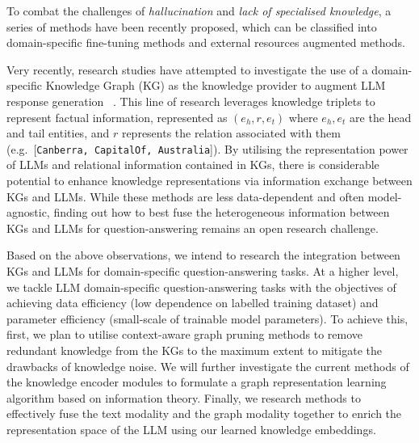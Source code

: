 To combat the challenges of \emph{hallucination} and \emph{lack of specialised knowledge}, a series of methods have been recently proposed, which can be classified into domain-specific fine-tuning methods and external resources augmented methods.



Very recently, research studies have attempted to investigate the use of a domain-specific Knowledge Graph (KG) as the knowledge
provider to augment LLM response generation ~\parencite{gnp, graph-prompter, kalm-prompting}.
This line of research leverages knowledge triplets to represent factual information, represented as $(e_h, r, e_t)$ where $e_h, e_t$ are the head and tail entities, and $r$ represents the relation associated with them (e.g.\ [\texttt{Canberra, CapitalOf, Australia}]).
By utilising the representation power of LLMs and relational information contained in KGs, there is considerable potential to enhance knowledge representations via information exchange between KGs and LLMs.
While these methods are less data-dependent and often model-agnostic, finding out how to best fuse the heterogeneous information between KGs and LLMs for question-answering remains an open research challenge.

Based on the above observations, we intend to research the integration between KGs and LLMs for domain-specific question-answering tasks. 
At a higher level, we tackle LLM domain-specific question-answering tasks with the objectives of achieving data efficiency (low dependence on labelled training dataset) and parameter efficiency (small-scale of trainable model parameters).
To achieve this, first, we plan to utilise context-aware graph pruning methods to remove redundant knowledge from the KGs to the maximum extent to mitigate the drawbacks of knowledge noise. 
We will further investigate the current methods of the knowledge encoder modules to formulate a graph representation learning algorithm based on information theory. 
Finally, we research methods to effectively fuse the text modality and the graph modality together to enrich the representation space of the LLM using our learned knowledge embeddings.
